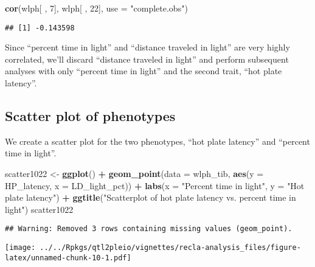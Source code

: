 \documentclass[oneside]{book}
\newenvironment{Shaded}{\begin{snugshade}}{\end{snugshade}}
\newcommand{\DataTypeTok}[1]{\textcolor[rgb]{0.13,0.29,0.53}{#1}}
\newcommand{\DecValTok}[1]{\textcolor[rgb]{0.00,0.00,0.81}{#1}}
\newcommand{\KeywordTok}[1]{\textcolor[rgb]{0.13,0.29,0.53}{\textbf{#1}}}
\newcommand{\NormalTok}[1]{#1}
\newcommand{\OperatorTok}[1]{\textcolor[rgb]{0.81,0.36,0.00}{\textbf{#1}}}
\newcommand{\StringTok}[1]{\textcolor[rgb]{0.31,0.60,0.02}{#1}}
\begin{document}
\begin{Shaded}
\begin{Highlighting}[]
\KeywordTok{cor}\NormalTok{(wlph[ , }\DecValTok{7}\NormalTok{], wlph[ , }\DecValTok{22}\NormalTok{], }\DataTypeTok{use =} \StringTok{"complete.obs"}\NormalTok{)}
\end{Highlighting}
\end{Shaded}

\begin{verbatim}
## [1] -0.143598
\end{verbatim}

Since ``percent time in light'' and ``distance traveled in light'' are
very highly correlated, we'll discard ``distance traveled in light'' and
perform subsequent analyses with only ``percent time in light'' and the
second trait, ``hot plate latency''.

\hypertarget{scatter-plot-of-phenotypes}{%
\subsection{Scatter plot of
phenotypes}\label{scatter-plot-of-phenotypes}}

We create a scatter plot for the two phenotypes, ``hot plate latency''
and ``percent time in light''.

\begin{Shaded}
\begin{Highlighting}[]
\NormalTok{scatter1022 <-}\StringTok{ }\KeywordTok{ggplot}\NormalTok{() }\OperatorTok{+}\StringTok{ }\KeywordTok{geom_point}\NormalTok{(}\DataTypeTok{data =}\NormalTok{ wlph_tib, }\KeywordTok{aes}\NormalTok{(}\DataTypeTok{y =}\NormalTok{ HP_latency, }\DataTypeTok{x =}\NormalTok{ LD_light_pct)) }\OperatorTok{+}\StringTok{ }\KeywordTok{labs}\NormalTok{(}\DataTypeTok{x =} \StringTok{"Percent time in light"}\NormalTok{, }\DataTypeTok{y =} \StringTok{"Hot plate latency"}\NormalTok{) }\OperatorTok{+}\StringTok{ }\KeywordTok{ggtitle}\NormalTok{(}\StringTok{"Scatterplot of hot plate latency vs. percent time in light"}\NormalTok{)}
\NormalTok{scatter1022}
\end{Highlighting}
\end{Shaded}

\begin{verbatim}
## Warning: Removed 3 rows containing missing values (geom_point).
\end{verbatim}

\texttt{[image: ../../Rpkgs/qtl2pleio/vignettes/recla-analysis\_files/figure-latex/unnamed-chunk-10-1.pdf]}
\end{document}
